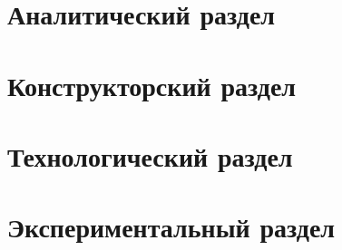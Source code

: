 \chapter{Аналитический раздел}

\chapter{Конструкторский раздел}

\chapter{Технологический раздел}

\chapter{Экспериментальный раздел}
